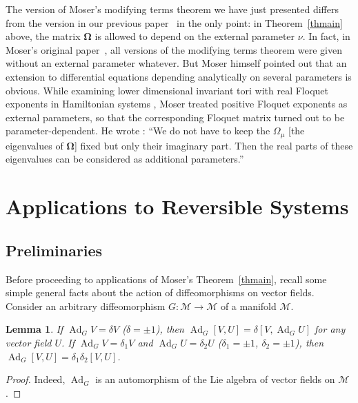 \documentclass[12pt,reqno]{amsart}
\newtheorem{lem}{Lemma} \newtheorem{thm}{Theorem}
\theoremstyle{definition}
\begin{document}
The version of Moser's modifying terms theorem we have just presented differs
from the version in our previous paper~\cite{S11} in the only point: in
Theorem~\ref{thmain} above, the matrix ${\mathbf{\Omega}}$ is allowed to depend on the
external parameter $\nu$. In fact, in Moser's original paper~\cite{M67}, all
versions of the modifying terms theorem were given without an external
parameter whatever. But Moser himself pointed out \cite[p.~170]{M67} that an
extension to differential equations depending analytically on several
parameters is obvious. While examining lower dimensional invariant tori with
real Floquet exponents in Hamiltonian systems \cite[Section~6d)]{M67}, Moser
treated positive Floquet exponents as external parameters, so that the
corresponding Floquet matrix turned out to be parameter-dependent. He wrote
\cite[p.~174]{M67}: ``We do not have to keep the $\Omega_\mu$ [the eigenvalues
of ${\mathbf{\Omega}}$] fixed but only their imaginary part. Then the real parts of
these eigenvalues can be considered as additional parameters.''

\section{Applications to Reversible Systems}\label{we}

\subsection{Preliminaries}\label{prelim}

Before proceeding to applications of Moser's Theorem~\ref{thmain}, recall some
simple general facts about the action of diffeomorphisms on vector fields.
Consider an arbitrary diffeomorphism $G:{\mathcal M}\to{\mathcal M}$ of a manifold ${\mathcal M}$.

\begin{lem}\label{lemA}
If $\operatorname{Ad}_GV=\delta V$ \textup{(}$\delta=\pm 1$\textup{)}, then
$\operatorname{Ad}_G[V,U]=\delta[V,\operatorname{Ad}_GU]$ for any vector field $U$. If $\operatorname{Ad}_GV=\delta_1V$
and $\operatorname{Ad}_GU=\delta_2U$ \textup{(}$\delta_1=\pm 1$, $\delta_2=\pm 1$\textup{)},
then $\operatorname{Ad}_G[V,U]=\delta_1\delta_2[V,U]$.
\end{lem}

\begin{proof}
Indeed, $\operatorname{Ad}_G$ is an automorphism of the Lie algebra of vector fields on
${\mathcal M}$.
\end{proof}
\end{document}
